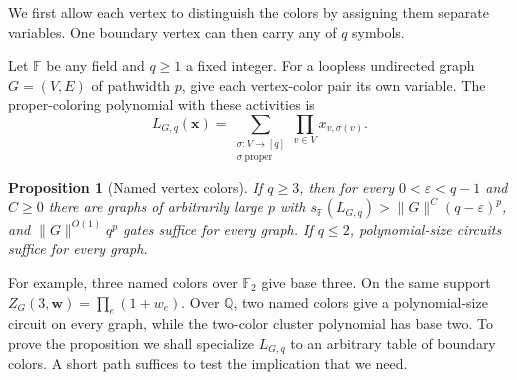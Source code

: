 \documentclass[11pt]{article}
\newtheorem{proposition}[theorem]{Proposition}
\theoremstyle{definition}
\newcommand{\F}{\mathbb F}
\begin{document}
We first allow each vertex to distinguish the colors by assigning them separate variables. One boundary vertex can then carry any of \(q\) symbols.

Let \(\F\) be any field and \(q\ge1\) a fixed integer. For a loopless undirected graph \(G=(V,E)\) of pathwidth \(p\), give each vertex-color pair its own variable. The proper-coloring polynomial with these activities is
\begin{equation}\label{eq:list}
 L_{G,q}(\mathbf x)=\sum_{\substack{\sigma:V\to[q]\\\sigma\ \mathrm{proper}}}
                      \prod_{v\in V}x_{v,\sigma(v)} .
\end{equation}

\begin{proposition}[Named vertex colors]\label{prop:named}
If \(q\ge3\), then for every \(0<\varepsilon<q-1\) and \(C\ge0\) there are graphs of arbitrarily large \(p\) with \(s_{\F}(L_{G,q})>\|G\|^C(q-\varepsilon)^p\), and \(\|G\|^{O(1)}q^p\) gates suffice for every graph. If \(q\le2\), polynomial-size circuits suffice for every graph.
\end{proposition}

For example, three named colors over \(\F_2\) give base three. On the same support \(Z_G(3,\mathbf w)=\prod_e(1+w_e)\). Over \(\mathbb Q\), two named colors give a polynomial-size circuit on every graph, while the two-color cluster polynomial has base two. To prove the proposition we shall specialize \(L_{G,q}\) to an arbitrary table of boundary colors. A short path suffices to test the implication that we need.
\end{document}
